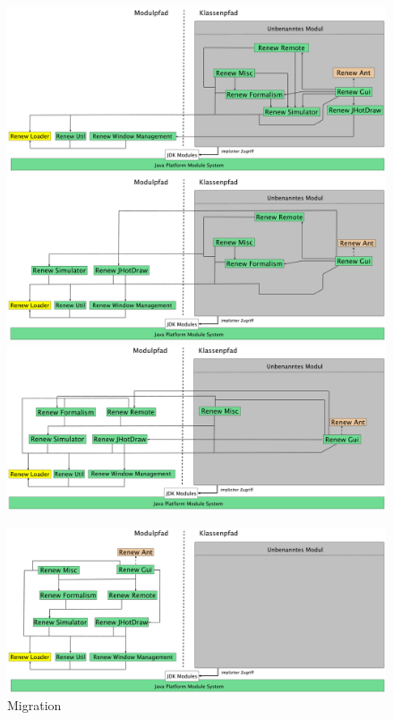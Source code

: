 	\begin{figure}[hbt!] 
	  \centering
	  \includegraphics[width=0.997\textwidth]{material/images/renew_plugin_dependencies-migrate_1b.pdf}\bigbreak\bigbreak
	  \includegraphics[width=0.997\textwidth]{material/images/renew_plugin_dependencies-migrate_2b.pdf}\bigbreak\bigbreak
  	  \includegraphics[width=0.997\textwidth]{material/images/renew_plugin_dependencies-migrate_3b.pdf}\bigbreak\bigbreak
  	\end{figure}
  	\begin{figure}[t!] 
	  \centering
  	  \includegraphics[width=0.997\textwidth]{material/images/renew_plugin_dependencies-migrate_4b.pdf}
  	  \caption{Migration}
	  \label{fig:mig}
	\end{figure}

